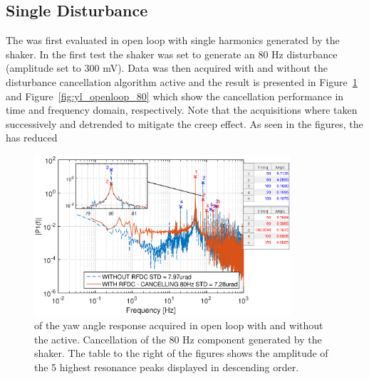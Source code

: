 \subsection{Single Disturbance}
The \abbrRFDC was first evaluated in open loop with single harmonics generated by the shaker. In the first test the shaker was set to generate an 80 Hz disturbance (amplitude set to 300 mV). Data was then acquired with and without the disturbance cancellation algorithm active and the result is presented in Figure~\ref{fig:fft_openloop_80} and Figure~\ref{fig:yl_openloop_80} which show the cancellation performance in time and frequency domain, respectively. Note that the acquisitions where taken successively and detrended to mitigate the creep effect. As seen in the figures, the \abbrRFDC has reduced

\begin{figure}[h!]
  \centering %
  \includegraphics[width=0.85\textwidth, trim=0cm 0cm 0cm 0cm, clip=true]{fig/matlab/fft_openloop_ext_disturbance_80Hz_with_zoom}
  \caption{\label{fig:fft_openloop_80} \abbrFFT of the yaw angle response acquired in open loop with and without the \abbrRFDC active. Cancellation of the 80 Hz component generated by the shaker. The table to the right of the figures shows the amplitude of the 5 highest resonance peaks displayed in descending order.}
\end{figure}


